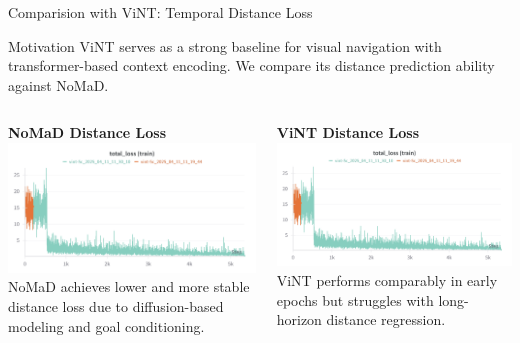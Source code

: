 \documentclass{beamer}
\begin{document}
\begin{frame}{Comparision with ViNT: Temporal Distance Loss}
        \begin{block}{Motivation}
            ViNT serves as a strong baseline for visual navigation with transformer-based context encoding. We compare its distance prediction ability against NoMaD.
        \end{block}
    
        \begin{columns}
            \begin{column}{0.48\textwidth}
                \begin{block}{\centering \small \textbf{NoMaD Distance Loss}}
                    \centering
                    \includegraphics[width=\textwidth]{images/distloss_vint.png}
                    \tiny NoMaD achieves lower and more stable distance loss due to diffusion-based modeling and goal conditioning.
                \end{block}
            \end{column}
    
            \begin{column}{0.48\textwidth}
                \begin{block}{\centering \small \textbf{ViNT Distance Loss}}
                    \centering
                    \includegraphics[width=\textwidth]{images/distloss_vint.png}
                    \tiny ViNT performs comparably in early epochs but struggles with long-horizon distance regression.
                \end{block}
            \end{column}
        \end{columns}
    

\end{frame}
\end{document}
